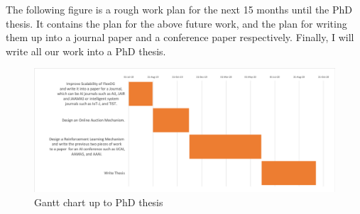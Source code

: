 \documentclass[11pt]{phdthesis}
\newcommand{\source}[1]{\caption*{Source: {#1}} }
\begin{document}
	

    The following figure is a rough work plan for the next 15 months until the PhD thesis. It contains the plan for the above future work, and the plan for writing them up into a journal paper and a conference paper respectively. Finally, I will write all our work into a PhD thesis. 

\begin{figure}
	\center
	\includegraphics[width = 1\textwidth]{./Figures/GanttChart.png}
	\caption{Gantt chart up to PhD thesis}
	\label{fig:Gantt chart}
\end{figure}


%
\backmatter


\end{document}
